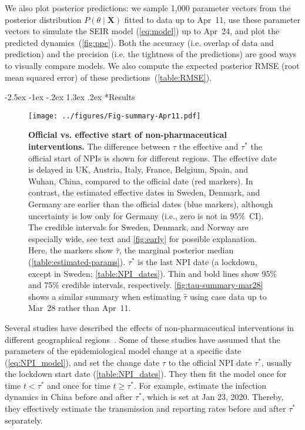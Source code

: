 \documentclass[12pt]{extarticle}
\makeatletter
\renewcommand\section{\@startsection {section}{1}{\z@}%
     {-2.5ex \@plus -1ex \@minus -.2ex}%
     {1.3ex \@plus.2ex}%
    {\Large\bfseries}}
\let\vec\mathbf
\makeatother
\begin{document}
We also plot posterior predictions: we sample 1,000 parameter vectors from the posterior distribution $P(\theta \mid \vec{X})$ fitted to data up to Apr~11, use these parameter vectors to simulate the SEIR model (\autoref{eq:model}) up to Apr~24, and plot the predicted dynamics~(\autoref{fig:ppc}).
Both the accuracy (i.e. overlap of data and prediction) and the precision (i.e. the tightness of the predictions) are good ways to visually compare models.
We also compute the expected posterior RMSE (root mean squared error) of these predictions~(\autoref{table:RMSE}).



\section*{Results}


\begin{figure}[b!]
    \centering
	\texttt{[image: ../figures/Fig-summary-Apr11.pdf]}	
    \caption{
    \textbf{Official vs. effective start of non-pharmaceutical interventions.}
    	The difference between $\tau$ the effective and $\tau^*$ the official start of NPIs is shown for different regions. The effective date is delayed in UK, Austria, Italy, France, Belgium, Spain, and Wuhan, China, compared to the official date (red markers). In contrast, the estimated effective dates in Sweden, Denmark, and Germany are earlier than the official dates (blue markers), although uncertainty is low only for Germany (i.e., zero is not in 95\%~CI). The credible intervals for Sweden, Denmark, and Norway are especially wide, see text and \autoref{fig:early} for possible explanation.
	Here, the markers show $\hat{\tau}$, the marginal posterior median (\autoref{table:estimated-params}). $\tau^*$ is the last NPI date (a lockdown, except in Sweden; \autoref{table:NPI_dates}). Thin and bold lines show 95\% and 75\% credible intervals, respectively. \autoref{fig:tau-summary-mar28} shows a similar summary when estimating $\hat{\tau}$ using case data up to Mar~28 rather than Apr~11.
    }
    \label{fig:tau-summary}
\end{figure}



Several studies have described the effects of non-pharmaceutical interventions in different geographical regions~\citep{Flaxman2020,Gatto2020,Li2020}. 
Some of these studies have assumed that the parameters of the epidemiological model change at a specific date (\autoref{eq:NPI_model}), and set the change date $\tau$ to the official NPI date $\tau^*$, usually the lockdown start date (\autoref{table:NPI_dates}).
They then fit the model once for time $t<\tau^*$ and once for time $t \ge \tau^*$.
For example, \citet{Li2020} estimate the infection dynamics in China before and after $\tau^*$, which is set at Jan 23, 2020. Thereby, they effectively estimate the transmission and reporting rates before and after $\tau^*$ separately.
\end{document}
